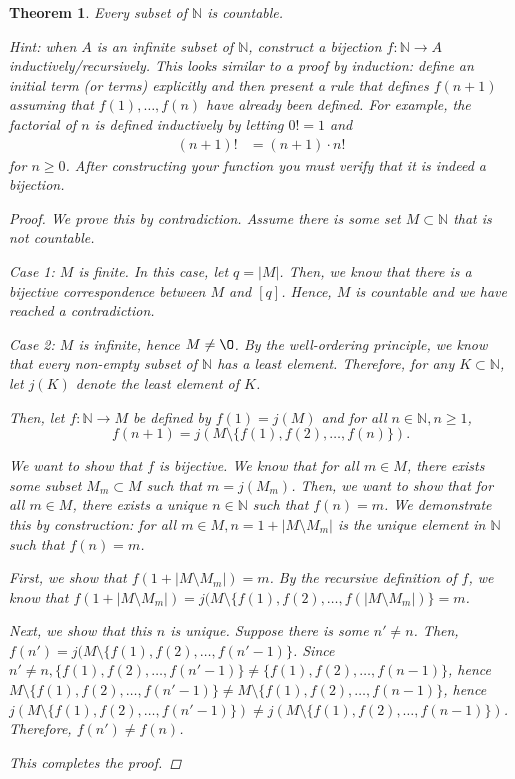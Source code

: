 \documentclass[11pt]{article}
\newcommand{\bbN}{\mathbb{N}}
\renewcommand{\emptyset}{\O}
\newtheorem{theorem}{Theorem}[section]
\theoremstyle{definition}
\numberwithin{equation}{subsection}
\begin{document}
\begin{theorem} \label{subsetbbN}
  Every subset of $\bbN$ is countable.
  
Hint: when $A$ is an infinite subset of $\bbN$,
    construct a bijection $f\colon\bbN\to A$ inductively/recursively. This looks similar to a proof by induction: define an initial term (or terms)
explicitly and then present a rule that defines $f(n+1)$ assuming that
$f(1),\ldots, f(n) $ have already been defined. For example, the factorial of $n$ is defined
inductively by letting $0! = 1$ and
\begin{align*}
  (n+1)! & = (n+1)\cdot n!
\end{align*}
for $n\geq 0$. After constructing your function you must verify that it is indeed a bijection.

\begin{proof}
We prove this by contradiction. Assume there is some set $M \subset \bbN$ that is not countable. 

Case 1: $M$ is finite. In this case, let $q=|M|$. Then, we know that there is a bijective correspondence between $M$ and $[q]$. Hence, $M$ is countable and we have reached a contradiction.

Case 2: $M$ is infinite, hence $M \not = \emptyset$. By the well-ordering principle, we know that every non-empty subset of $\bbN$ has a least element. Therefore, for any $K \subset \bbN$, let $j(K)$ denote the least element of $K$. 

Then, let $f \colon \bbN \rightarrow M$ be defined by $f(1)=j(M)$ and for all $n\in \bbN, n\geq1$, 
\[
f(n+1)=j(M\setminus\{f(1),f(2),\dots,f(n)\}).
\]

We want to show that $f$ is bijective. We know that for all $m \in M$, there exists some subset $M_m \subset M$ such that $m=j(M_m)$. Then, we want to show that for all $m \in M$, there exists a unique $n \in \bbN$ such that $f(n)=m$. We demonstrate this by construction: for all $m \in M, n = 1 + |M\setminus M_m|$ is the unique element in $\bbN$ such that $f(n)=m$. 

First, we show that $f(1 + |M\setminus M_m|) =m$. By the recursive definition of $f$, we know that $f(1 + |M\setminus M_m|)=j(M\setminus\{f(1),f(2),\dots,f(|M \setminus M_m|)\} = m$.

Next, we show that this $n$ is unique. Suppose there is some $n' \not= n$. Then, $f(n')=j(M\setminus\{f(1),f(2),\dots,f(n'-1)\}$. Since $n' \not= n, \{f(1),f(2),\dots,f(n'-1)\} \not = \{f(1),f(2),\dots,f(n-1)\}$, hence $M\setminus\{f(1),f(2),\dots,f(n'-1)\} \not= M\setminus\{f(1),f(2),\dots,f(n-1)\}$, hence $j(M\setminus\{f(1),f(2),\dots,f(n'-1)\}) \not= j(M\setminus\{f(1),f(2),\dots,f(n-1)\})$. Therefore, $f(n') \not= f(n)$.



This completes the proof.

\renewcommand\qedsymbol{QED}
\end{proof}

\end{theorem}
\end{document}
